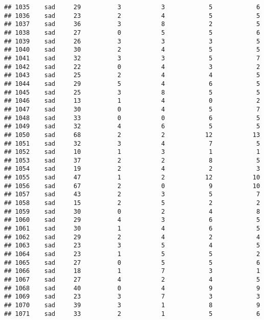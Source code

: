 \documentclass[
]{article}
\begin{document}
\begin{verbatim}
## 1035    sad     29          3           3            5            6
## 1036    sad     23          2           4            5            5
## 1037    sad     36          3           8            2            5
## 1038    sad     27          0           5            5            6
## 1039    sad     26          3           3            3            5
## 1040    sad     30          2           4            5            5
## 1041    sad     32          3           3            5            7
## 1042    sad     22          0           4            3            2
## 1043    sad     25          2           4            4            5
## 1044    sad     29          5           4            6            5
## 1045    sad     25          3           8            5            5
## 1046    sad     13          1           4            0            2
## 1047    sad     30          0           4            5            7
## 1048    sad     33          0           0            6            5
## 1049    sad     32          4           6            5            5
## 1050    sad     68          2           2           12           13
## 1051    sad     32          3           4            7            5
## 1052    sad     10          1           3            1            1
## 1053    sad     37          2           2            8            5
## 1054    sad     19          2           4            2            3
## 1055    sad     47          1           2           12           10
## 1056    sad     67          2           0            9           10
## 1057    sad     43          2           3            5            7
## 1058    sad     15          2           5            2            2
## 1059    sad     30          0           2            4            8
## 1060    sad     29          4           3            6            5
## 1061    sad     30          1           4            6            5
## 1062    sad     29          2           4            2            4
## 1063    sad     23          3           5            4            5
## 1064    sad     23          1           5            5            2
## 1065    sad     27          0           5            5            6
## 1066    sad     18          1           7            3            1
## 1067    sad     27          4           2            4            5
## 1068    sad     40          0           4            9            9
## 1069    sad     23          3           7            3            3
## 1070    sad     39          3           1            8            9
## 1071    sad     33          2           1            5            6

\end{verbatim}
\end{document}

